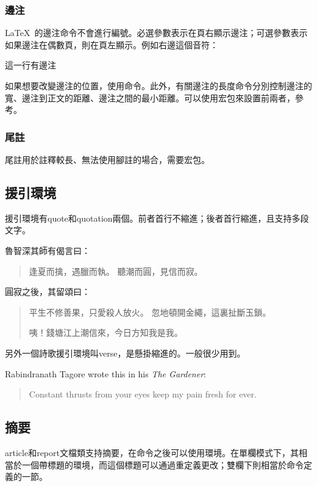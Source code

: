 \subsubsection{邊注}
\LaTeX\ 的邊注命令不會進行編號。必選參數表示在頁右顯示邊注；可選參數表示如果邊注在偶數頁，則在頁左顯示。例如右邊這個音符：\marginpar{\twonotes}
\begin{latex}
這一行有邊注
\end{latex}

如果想要改變邊注的位置，使用命令。此外，有關邊注的長度命令分別控制邊注的寬、邊注到正文的距離、邊注之間的最小距離。可以使用宏包來設置前兩者，參考。

\subsubsection{尾註}
尾註用於註釋較長、無法使用腳註的場合，需要宏包。

\subsection{援引環境}
援引環境有quote和quotation兩個。前者首行不縮進；後者首行縮進，且支持多段文字。

\begin{codeshow}
魯智深其師有偈言曰：
\begin{quote}
逢夏而擒，遇臘而執。
聽潮而圓，見信而寂。
\end{quote}
圓寂之後，其留頌曰：
\begin{quotation}
平生不修善果，只愛殺人放火。
忽地頓開金繩，這裏扯斷玉鎖。

咦！錢塘江上潮信來，今日方知我是我。
\end{quotation}
\end{codeshow}

另外一個詩歌援引環境叫verse，\label{envi:verse}是懸掛縮進的。一般很少用到。

\begin{codeshow}
Rabindranath Tagore wrote this in 
his \emph{The Gardener}: 
\begin{verse}
Constant thrusts from your eyes
keep my pain fresh for ever.
\end{verse}
\end{codeshow}

\subsection{摘要}
article和report文檔類支持摘要，在命令之後可以使用環境。在單欄模式下，其相當於一個帶標題的環境，而這個標題可以通過重定義更改；雙欄下則相當於命令定義的一節。

